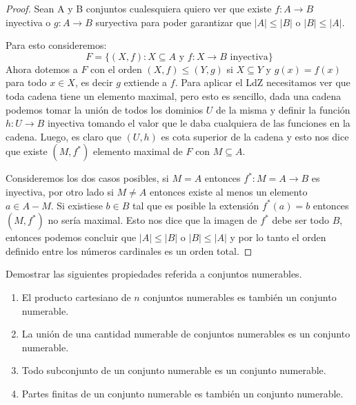 \documentclass{article}
\theoremstyle{definition}
\newenvironment{ejercicio}[1]{\begin{trivlist}
\item[\hskip \labelsep {\bfseries Ejercicio}\hskip \labelsep {\bfseries #1.}]}{\end{trivlist}}
\begin{document}
\begin{proof}
    Sean A y B conjuntos cualesquiera quiero ver que existe \( f : A \to B \) inyectiva o \( g: A \to B \) suryectiva para poder garantizar que \( |A| \leq |B| \) o \( |B| \leq |A| \).

    Para esto consideremos: \[
        F = \{  (X, f) : X \subseteq A \text{ y } f: X \to B \text{ inyectiva} \}
    \]
    Ahora dotemos a \( F \) con el orden \( (X, f) \leq ( Y, g ) \) si \( X \subseteq Y \) y \( g(x) = f(x) \) para todo \( x \in X \), es decir \( g \) extiende a \( f \).
    Para aplicar el LdZ necesitamos ver que toda cadena tiene un elemento maximal, pero esto es sencillo, dada una cadena podemos tomar la unión de todos los dominios \( U \) de la misma y definir la función \( h: U \to B \) inyectiva tomando el valor que le daba cualquiera de las funciones en la cadena.
    Luego, es claro que \( (U, h) \) es cota superior de la cadena y esto nos dice que existe \( (M, f^*) \) elemento maximal de \( F \) con \( M \subseteq A \).

    Consideremos los dos casos posibles, si \( M = A \) entonces \( f^* : M = A \to B \) es inyectiva, por otro lado si \( M \neq A \) entonces existe al menos un elemento \( a \in A - M \). Si existiese \( b \in B \) tal que es posible la extensión \( f^*(a) = b \) entonces \( (M, f^*) \) no sería maximal.
    Esto nos dice que la imagen de \( f^* \) debe ser todo \( B \), entonces podemos concluir que \( |A| \leq |B| \) o \( |B| \leq |A| \) y por lo tanto el orden definido entre los números cardinales es un orden total.
\end{proof}

\begin{ejercicio}{10}
    Demostrar las siguientes propiedades referida a conjuntos numerables.
    \begin{enumerate}
        \item El producto cartesiano de \(n\) conjuntos numerables es también un conjunto numerable.
        \item La unión de una cantidad numerable de conjuntos numerables es un conjunto numerable.
        \item Todo subconjunto de un conjunto numerable es un conjunto numerable.
        \item Partes finitas de un conjunto numerable es también un conjunto numerable.
    \end{enumerate}
\end{ejercicio}
\end{document}
